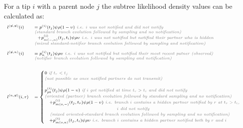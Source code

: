 \documentclass[a4paper,10pt]{article}
\begin{document}
For a tip $i$ with a parent node $j$ the subtree likelihood density values can be calculated as:
\begin{equation}
\scriptsize
\begin{array}{ll}
l^{(\not{n},\not{n})}(i) &= p^{(i)}(t_j)\psi\rho (1-\upsilon) \textit{\color{gray} ~i.e. $i$ was not notified and did not notify}\\
& \textit{\color{gray} (standard branch evolution followed by sampling and no notification)}\\
&~~+p_{m(-,n)}^{(i)}(t_j,t_i)\psi\rho\upsilon \textit{\color{gray} ~i.e. $i$ was not notified but notified their partner who is hidden}\\
& \textit{\color{gray} (mixed standard-notifier branch evolution followed by sampling and notification)}\\
\\
l^{(\not{n},n)}(i) &= p_n^{(i)}(t_j)\psi\rho
\upsilon \textit{\color{gray} ~i.e. $i$ was not notified but notified their most recent patner (observed)}\\
& \textit{\color{gray} (notifier branch evolution followed by sampling and notification)}\\
&~~\\
\\
l^{(n,\not{n})}(i,r) &= \begin{cases}
0 \textit{\color{gray} ~if $t_r < t_j$}\\
\textit{\color{gray} (not possible as once notified partners do not transmit)}
\\
\\
p_{pb}^{(i)}(t_j)\psi\rho(1 - \upsilon) \textit{\color{gray} ~if $i$ got notified at time $t_r > t_i$ and did not notify}\\
\textit{\color{gray} (oriented (partner) branch evolution followed by standard sampling and no notification)}
\\
~~~+p_{m(o,-)}^{(i)}(t_j,t_r)\psi\rho(1-\upsilon) \textit{\color{gray} ~i.e. branch $i$ contains a hidden partner notified by $r$ at $t_r > t_i$, }\\
\textit{\color{gray} ~~~~~~~~~~~~~~~~~~~~~~~~~~~~~~~~~~~~~~~~~$i$  did not notify}\\
 \textit{\color{gray} ~~~(mixed oriented-standard branch evolution followed by sampling and no notification)}\\
 ~~~+p_{m(o,n)}^{(i)}(t_j,t_i)\psi\rho\upsilon \textit{\color{gray} ~i.e. branch $i$ contains a hidden partner notified both by $r$ and $i$}\\

\end{cases}
\end{array}
\end{equation}
\end{document}
